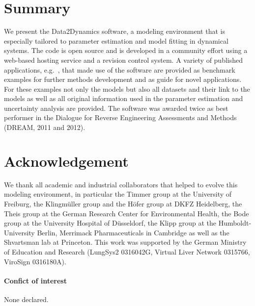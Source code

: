 \documentclass{bioinfo}
\begin{document}
\section{Summary}
We present the Data2Dynamics software, a modeling environment that is especially tailored to parameter estimation and model fitting in dynamical systems. The code is open source and is developed in a community effort using a web-based hosting service and a revision control system. A variety of published applications, e.g.~\citet{Becker:2010hs, Raia:2011vn, Bachmann:2011fk}, that made use of the software are provided as benchmark examples for further methods development and as guide for novel applications. For these examples not only the models but also all datasets and their link to the models as well as all original information used in the parameter estimation and uncertainty analysis are provided. The software was awarded twice as best performer in the Dialogue for Reverse Engineering Assessments and Methods (DREAM, 2011 and 2012).

\section*{Acknowledgement}
We thank all academic and industrial collaborators that helped to evolve this modeling environment, in particular the Timmer group at the University of Freiburg, the Klingm\"uller group and the H\"ofer group at DKFZ Heidelberg, the Theis group at the German Research Center for Environmental Health, the Bode group at the University Hospital of D\"usseldorf, the Klipp group at the Humboldt-University Berlin, Merrimack Pharmaceuticals in Cambridge as well as the Shvartsman lab at Princeton. 
%
This work was supported by the German Ministry of Education and Research (LungSys2 0316042G, Virtual Liver Network 0315766, ViroSign 0316180A).

\paragraph{Confict of interest\textcolon} None declared.



\end{document}
